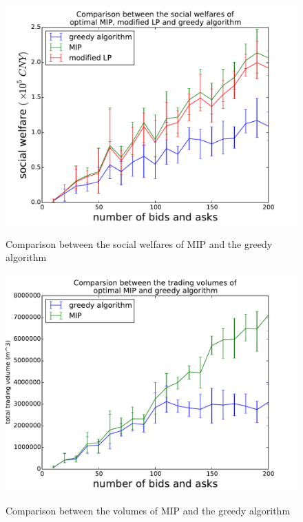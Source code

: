 \documentclass{aamas2015}
\begin{document}
\begin{figure}[!ht]
	\centering
		\caption{Comparison between the social welfares of MIP and the greedy algorithm}
	\includegraphics[scale=0.45]{compare.pdf}
	\label{fig:compare}
\end{figure}
\begin{figure}[!ht]
	\centering
	\caption{Comparison between the volumes of MIP and the greedy algorithm}
	\includegraphics[scale=0.45]{compvol.pdf}
	\label{fig:compvol}
\end{figure}
\end{document}
